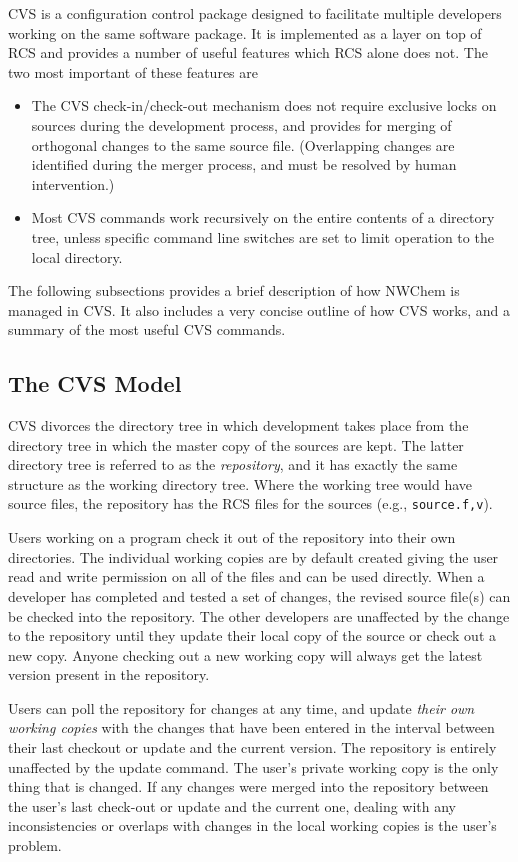 CVS is a configuration
control package designed to facilitate multiple developers working on
the same software package.  It is implemented as a layer on top of RCS
and provides a number of useful features which RCS alone does not.
The two most important of these features are 
\begin{itemize}
\item The CVS check-in/check-out mechanism does not require exclusive
locks on sources during the development process, and provides for
merging of orthogonal changes to the same source file.  (Overlapping
changes are identified during the merger process, and must be resolved
by human intervention.)
\item  Most CVS commands work recursively
on the entire contents of a directory tree, unless specific command line
switches are set to limit operation to the local directory.
\end{itemize}
The following subsections provides a brief description of how NWChem is managed in
CVS.  It also includes a very concise outline of how CVS works, and a
summary of the most useful CVS commands.

\subsection{The CVS Model}

CVS divorces the directory tree in which development takes place from
the directory tree in which the master copy of the sources are kept.
The latter directory tree is referred to as the {\em repository}, and
it has exactly the same structure as the working directory tree.  Where
the working tree would have source files, the repository has the RCS
files for the sources (e.g., {\tt source.f,v}).

Users working on a program check it out of the repository
into their own directories.  The individual working copies are by
default created giving the user read and write permission on all of
the files and can be used directly.  When a developer has completed
and tested a set of changes, the revised source file(s) can be checked into
the repository.  The other developers are unaffected by the change to
the repository until they update their local copy of the source or
check out a new copy.  Anyone checking out a new working copy will
always get the latest version present in the repository.

Users can poll the repository for changes at any time, and update {\em
their own working copies} with the changes that have been entered in the
interval between their last checkout or
update and the current version.  The repository is entirely unaffected
by the update command.  The user's private working copy is the only
thing that is changed.  If any changes were merged into the repository
between the user's last check-out or update and the current one,
dealing with any inconsistencies or overlaps with changes in the
local working copies is the user's problem.

